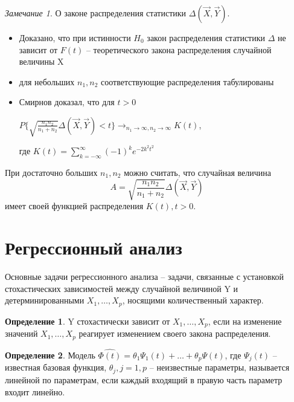 \documentclass[a4paper, 12pt]{article}
\theoremstyle{definition}
\newtheorem{definition}{Определение}[section]
\theoremstyle{leads}
\theoremstyle{example}
\theoremstyle{remark}
\newtheorem{remark}{Замечание}
\begin{document}
\begin{remark}
	О законе распределения статистики $\Delta(\vec{X}, \vec{Y})$.
	\begin{itemize}
		\item Доказано, что при истинности $H_0$ закон распределения статистики $\Delta$ не зависит от $F(t)$ -- теоретического закона распределения случайной величины X
		\item для небольших $n_1, n_2$ соответствующие распределения табулированы
		\item Смирнов доказал, что для $t > 0$
		\begin{center}
			\centering
			$P\{\sqrt{\frac{n_1 n_2}{n_1 + n_2}}\Delta(\vec{X}, \vec{Y}) < t\} \rightarrow_{n_1 \rightarrow \infty, n_2 \rightarrow \infty} K(t)$,
		\end{center}
	где $K(t) = \sum_{k= - \infty}^{\infty} (-1)^k e^{-2k^2t^2}$
	\end{itemize}

При достаточно больших $n_1, n_2$ можно считать, что случайная величина 
\begin{equation*}
	A = \sqrt{\frac{n_1 n_2}{n_1 + n_2}} \Delta(\vec{X}, \vec{Y})
\end{equation*}
имеет своей функцией распределения $K(t), t > 0$.
\end{remark}

\section{Регрессионный анализ}

Основные задачи регрессионного анализа -- задачи, связанные с установкой стохастических зависимостей между случайной величиной Y и детерминированными $X_1, \dots, X_p$, носящими количественный характер.

\begin{definition}
	Y стохастически зависит от $X_1, \dots, X_p$, если на изменение значений $X_1, \dots, X_p$ реагирует изменением своего закона распределения.
\end{definition}

\begin{definition}
	Модель $\hat{\Phi(t)} = \theta_1\Psi_1(t) + \dots + \theta_p\Psi(t)$, где $\Psi_j(t)$ -- известная базовая функция, $\theta_j, j = \hat{1,p}$ -- неизвестные параметры, называется линейной по параметрам, если каждый входящий в правую часть параметр входит линейно.
\end{definition}
\end{document}
